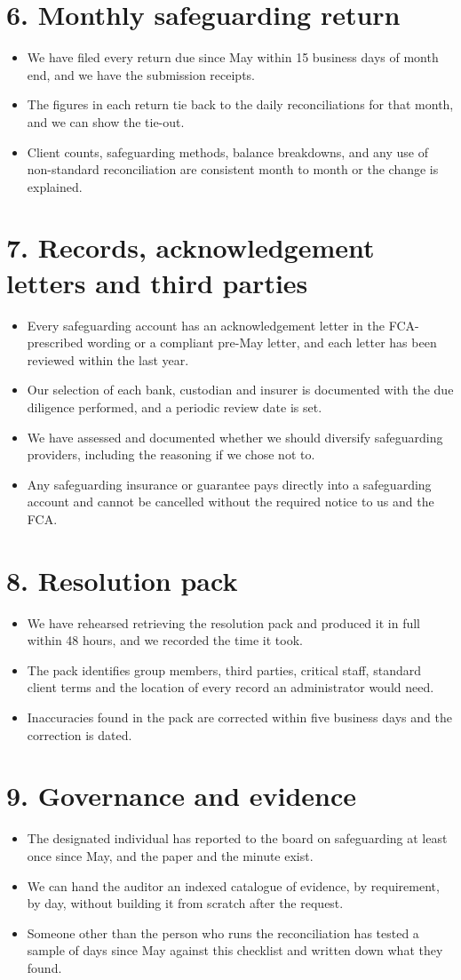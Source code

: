 \documentclass[a4paper,10.5pt]{article}
\newcommand{\q}[1]{\item[$\square$] #1}
\begin{document}
\section*{6. Monthly safeguarding return}
\begin{itemize}
\q{We have filed every return due since May within 15 business days of month end, and we have the submission receipts.}
\q{The figures in each return tie back to the daily reconciliations for that month, and we can show the tie-out.}
\q{Client counts, safeguarding methods, balance breakdowns, and any use of non-standard reconciliation are consistent month to month or the change is explained.}
\end{itemize}

\section*{7. Records, acknowledgement letters and third parties}
\begin{itemize}
\q{Every safeguarding account has an acknowledgement letter in the FCA-prescribed wording or a compliant pre-May letter, and each letter has been reviewed within the last year.}
\q{Our selection of each bank, custodian and insurer is documented with the due diligence performed, and a periodic review date is set.}
\q{We have assessed and documented whether we should diversify safeguarding providers, including the reasoning if we chose not to.}
\q{Any safeguarding insurance or guarantee pays directly into a safeguarding account and cannot be cancelled without the required notice to us and the FCA.}
\end{itemize}

\section*{8. Resolution pack}
\begin{itemize}
\q{We have rehearsed retrieving the resolution pack and produced it in full within 48 hours, and we recorded the time it took.}
\q{The pack identifies group members, third parties, critical staff, standard client terms and the location of every record an administrator would need.}
\q{Inaccuracies found in the pack are corrected within five business days and the correction is dated.}
\end{itemize}

\section*{9. Governance and evidence}
\begin{itemize}
\q{The designated individual has reported to the board on safeguarding at least once since May, and the paper and the minute exist.}
\q{We can hand the auditor an indexed catalogue of evidence, by requirement, by day, without building it from scratch after the request.}
\q{Someone other than the person who runs the reconciliation has tested a sample of days since May against this checklist and written down what they found.}
\end{itemize}
\end{document}
